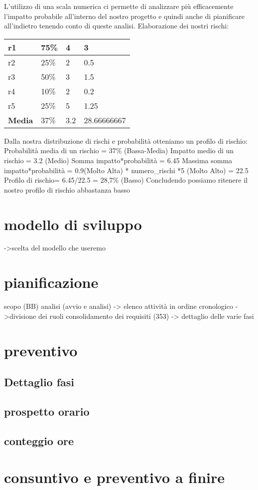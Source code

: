 \documentclass[12pt]{article}
\begin{document}
		L’utilizzo di una scala numerica ci permette di analizzare più efficacemente l’impatto probabile all’interno del nostro progetto e quindi anche di pianificare all’indietro tenendo conto di queste analisi.
		Elaborazione dei nostri rischi:
		\newline \newline
		\begin{tabularx}{\textwidth}{|X|X|X|X|}
			\hline
			r1 & 75\% & 4 & 3 \\
			\hline
			r2 &  25\%  & 2  & 0.5 \\
			\hline
			r3  & 50\%  & 3  & 1.5 \\
			\hline
			r4  & 10\% &  2 &  0.2 \\
			\hline
			r5  & 25\%  & 5  & 1.25 \\
			\hline
			\textbf{Media}  & 37\% &  3.2 &  28.66666667\\
			\hline
		\end{tabularx}
		\newline \newline
		Dalla nostra distribuzione di rischi e probabilità otteniamo un profilo di rischio:
		Probabilità media di un rischio = 37\% (Bassa-Media)
		Impatto medio di un rischio = 3.2 (Medio)
		Somma impatto*probabilità = 6.45
		Massima somma impatto*probabilità = 0.9(Molto Alta) * numero\_rischi *5 (Molto Alto) = 22.5
		Profilo di rischio= 6.45/22.5 = 28,7\% (Basso)
		Concludendo possiamo ritenere il nostro profilo di rischio abbastanza basso


	\section{modello di sviluppo}
	->scelta del modello che useremo


	\section{pianificazione}
	scopo (BB)
	analisi (avvio e analisi)
		-> elenco attività in ordine cronologico
		->divisione dei ruoli
	consolidamento dei requisiti (353)
	-> dettaglio delle varie fasi


	\section{preventivo}
	    \subsection{Dettaglio fasi}
		\subsection{prospetto orario}
		\subsection{conteggio ore}


	\section{consuntivo e preventivo a finire}
\end{document}
